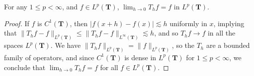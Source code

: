 \begin{lemma}
	For any $1 \leq p < \infty$, and $f \in L^p(\mathbf{T})$, $\lim_{h \to 0} T_h f = f$ in $L^p(\mathbf{T})$.
\end{lemma}
\begin{proof}
	If $f$ is $C^1(\mathbf{T})$, then $|f(x + h) - f(x)| \lesssim h$ uniformly in $x$, implying that $\| T_h f - f \|_{L^p(\mathbf{T})} \leq \| T_hf - f \|_{L^\infty(\mathbf{T})} \lesssim h$, and so $T_h f \to f$ in all the spaces $L^p(\mathbf{T})$. We have $\| T_h f \|_{L^p(\mathbf{T})} = \| f \|_{L^p(\mathbf{T})}$, so the $T_h$ are a bounded family of operators, and since $C^1(\mathbf{T})$ is dense in $L^p(\mathbf{T})$ for $1 \leq p < \infty$, we conclude that $\lim_{h \to 0} T_h f = f$ for all $f \in L^p(\mathbf{T})$.
\end{proof}

